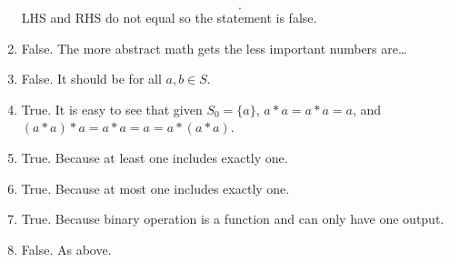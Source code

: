 \documentclass[12pt]{article}
\begin{document}
\begin{problem}[2.24]
\begin{enumerate}[label=\alph*)]
\[	.\]
	LHS and RHS do not equal so the statement is false.
	\item False. The more abstract math gets the less important numbers are\ldots
	\item False. It should be for all $a,b \in S$.
	\item True. It is easy to see that given $S_0=\{a\} $, $a*a=a*a=a$, and  $(a*a)*a=a*a=a=a*(a*a)$.
	\item True. Because at least one includes exactly one.
	\item True. Because at most one includes exactly one.
	\item True. Because binary operation is a function and can only have one output.
	\item False. As above.
\end{enumerate}
\end{problem}
\end{document}
